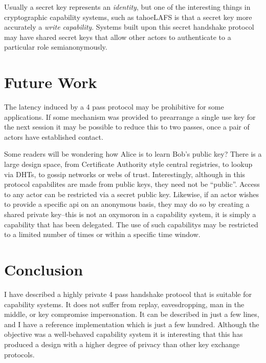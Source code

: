 \documentclass[12pt]{article}
\begin{document}
Usually a secret key represents an \emph{identity}, but one of the
interesting things in cryptographic capability systems, such as tahoeLAFS
is that a secret key more accurately a \emph{write capability}.
Systems built upon this secret handshake protocol may have shared
secret keys that allow other actors to authenticate to a particular
role semianonymously.

\section{Future Work}

The latency induced by a 4 pass protocol may be prohibitive for some
applications. If some mechanism was provided to prearrange a single
use key for the next session it may be possible to reduce this to two
passes, once a pair of actors have established contact.

Some readers will be wondering how Alice is to learn Bob's public key?
There is a large design space, from Certificate Authority style central
registries, to lookup via DHTs, to gossip networks or webs of trust.
Interestingly, although in this protocol capabilites are made from public
keys, they need not be ``public''. Access to any actor can be restricted
via a secret public key. Likewise, if an actor wishes to provide a
specific api on an anonymous basis, they may do so by creating a
shared private key--this is not an oxymoron in a capability system,
it is simply a capability that has been delegated. The use of such
capabilitys may be restricted to a limited number of times or within a
specific time window.

\section{Conclusion}

I have described a highly private 4 pass handshake protocol
that is suitable for capability systems. It does not suffer
from replay, eavesdropping, man in the middle,
or key compromise impersonation.
It can be described in just a few lines, and I have a reference
implementation which is just a few hundred.
Although the objective was a well-behaved capability system
it is interesting that this has produced a design with a higher
degree of privacy than other key exchange protocols.




\end{document}
